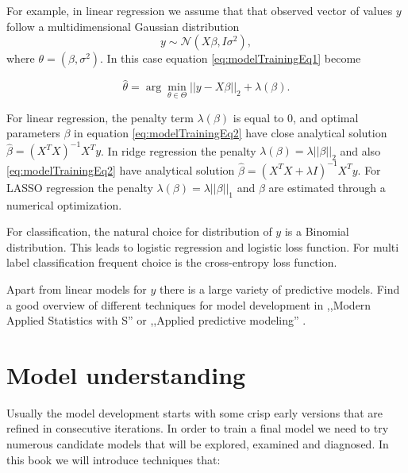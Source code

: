 \documentclass[]{krantz}
\begin{document}
For example, in linear regression we assume that that observed vector of values \(y\) follow a multidimensional Gaussian distribution
\[
y \sim \mathcal N(X \beta, I\sigma^2),
\]
where \(\theta = (\beta, \sigma^2)\). In this case equation \eqref{eq:modelTrainingEq1} become

\begin{equation}
\hat\theta = \arg \min_{\theta \in \Theta}  ||y - X \beta||_{2} + \lambda(\beta). 
\label{eq:modelTrainingEq2}
\end{equation}

For linear regression, the penalty term \(\lambda(\beta)\) is equal to \(0\), and optimal parameters \(\beta\) in equation \eqref{eq:modelTrainingEq2} have close analytical solution \(\hat \beta = (X^TX)^{-1}X^Ty\). In ridge regression the penalty \(\lambda(\beta) = \lambda ||\beta||_2\) and also \eqref{eq:modelTrainingEq2} have analytical solution \(\hat \beta = (X^TX + \lambda I)^{-1}X^Ty\). For LASSO regression the penalty \(\lambda(\beta) = \lambda ||\beta||_1\) and \(\beta\) are estimated through a numerical optimization.

For classification, the natural choice for distribution of \(y\) is a Binomial distribution. This leads to logistic regression and logistic loss function. For multi label classification frequent choice is the cross-entropy loss function.

Apart from linear models for \(y\) there is a large variety of predictive models. Find a good overview of different techniques for model development in ,,Modern Applied Statistics with S'' \citep{MASSbook} or ,,Applied predictive modeling'' \citep{Kuhn2013}.

\hypertarget{model-understanding}{%
\section{Model understanding}\label{model-understanding}}

Usually the model development starts with some crisp early versions that are refined in consecutive iterations. In order to train a final model we need to try numerous candidate models that will be explored, examined and diagnosed. In this book we will introduce techniques that:
\end{document}
